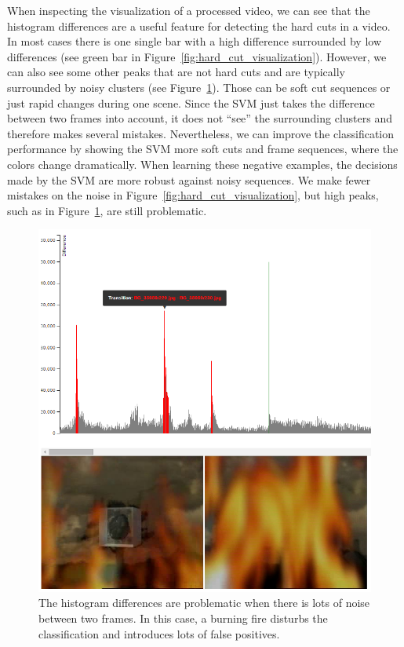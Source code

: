 When inspecting the visualization of a processed video, we can see that the histogram differences are a useful feature for detecting the hard cuts in a video.
In most cases there is one single bar with a high difference surrounded by low differences (see green bar in Figure~\ref{fig:hard_cut_visualization}).
However, we can also see some other peaks that are not hard cuts and are typically surrounded by noisy clusters (see Figure~\ref{fig:hard_cut_noise_visualization}).
Those can be soft cut sequences or just rapid changes during one scene.
Since the SVM just takes the difference between two frames into account, it does not ``see'' the surrounding clusters and therefore makes several mistakes.
Nevertheless, we can improve the classification performance by showing the SVM more soft cuts and frame sequences, where the colors change dramatically.
When learning these negative examples, the decisions made by the SVM are more robust against noisy sequences.
We make fewer mistakes on the noise in Figure~\ref{fig:hard_cut_visualization}, but high peaks, such as in Figure~\ref{fig:hard_cut_noise_visualization}, are still problematic.

\begin{figure}[ht]
	\centering
	\includegraphics[scale=.5]{images/hard_cut_noise_visualization.png}
	\caption{The histogram differences are problematic when there is lots of noise between two frames. In this case, a burning fire disturbs the classification and introduces lots of false positives.}
	\label{fig:hard_cut_noise_visualization}
\end{figure}
